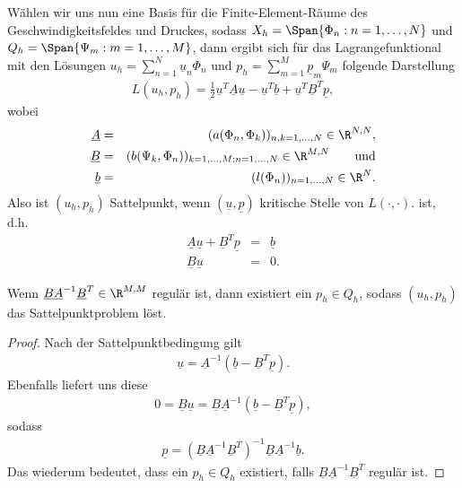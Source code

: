 Wählen wir uns nun eine Basis für die Finite-Element-Räume des
Geschwindigkeitsfeldes und Druckes, sodass
$X_h = \Span\{\Phi_n: n = 1, \dots, N\}$ und
$Q_h = \Span\{\Psi_m: m = 1, \dots, M\}$, 
dann ergibt sich für das Lagrangefunktional mit den Lösungen
$u_h = \sum_{n=1}^N \underline u_n \Phi_n$ und
$p_h = \sum_{m=1}^M \underline p_m \Psi_m$ folgende Darstellung
\begin{eqnarray*}
      L(u_h, p_h)
    = \frac{1}{2} \underline u^T \underline A \underline u - \underline u^T
      \underline b + \underline u^T \underline B^T \underline p,
\end{eqnarray*}
wobei
\begin{eqnarray*}
    \underline A &=& (a(\Phi_n, \Phi_k))_{n,k=1,\dots,N}\in \R^{N,N}, \\
    \underline B &=& (b(\Psi_k, \Phi_n))_{k=1,\dots,M;n=1,\dots,N}\in \R^{M,N}
    \qquad \text{und} \\
    \underline b &=& (l(\Phi_n))_{n=1,\dots,N}\in \R^N.
\end{eqnarray*}
Also ist $(u_h, p_h)$ Sattelpunkt, wenn $(\underline u, \underline p)$ kritische
Stelle von $L(\cdot, \cdot)$. ist, d.h.
\begin{eqnarray*}
    \underline A \underline u + \underline B^T \underline p &=& \underline b \\
    \underline B \underline u &=& 0.
\end{eqnarray*}


\begin{Lemma}
    \label{lem:5.6}
    Wenn $\underline B \underline A^{-1} \underline B^T\in \R^{M,M}$ regulär
    ist, dann existiert ein $p_h\in Q_h$, sodass $(u_h, p_h)$ das
    Sattelpunktproblem löst.
\end{Lemma}


\begin{proof}
    Nach der Sattelpunktbedingung gilt
    \begin{eqnarray*}
        \underline u = \underline A^{-1} (\underline b - \underline B^T
        \underline p).
    \end{eqnarray*}
    Ebenfalls liefert uns diese
    \begin{eqnarray*}
          0
        = \underline B \underline u
        = \underline B \underline A^{-1} (\underline b - \underline B^T
          \underline p),
    \end{eqnarray*}
    sodass
    \begin{eqnarray*}
          \underline p
        = (\underline B \underline A^{-1} \underline B^T)^{-1} \underline B
          \underline A^{-1} \underline b.
    \end{eqnarray*}
    Das wiederum bedeutet, dass ein $p_h\in Q_h$ existiert, falls
    $\underline B \underline A^{-1} \underline B^T$ regulär ist.
\end{proof}


